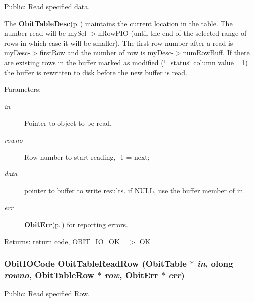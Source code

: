 Public: Read specified data. 

The {\bf Obit\-Table\-Desc}{\rm (p.\,\pageref{structObitTableDesc})} maintains the current location in the table. The number read will be my\-Sel-$>$n\-Row\-PIO (until the end of the selected range of rows in which case it will be smaller). The first row number after a read is my\-Desc-$>$first\-Row and the number of row is my\-Desc-$>$num\-Row\-Buff. If there are existing rows in the buffer marked as modified (\char`\"{}\_\-status\char`\"{} column value =1) the buffer is rewritten to disk before the new buffer is read. \begin{Desc}
\item[Parameters:]
\begin{description}
\item[{\em in}]Pointer to object to be read. \item[{\em rowno}]Row number to start reading, -1 = next; \item[{\em data}]pointer to buffer to write results. if NULL, use the buffer member of in. \item[{\em err}]{\bf Obit\-Err}{\rm (p.\,\pageref{structObitErr})} for reporting errors. \end{description}
\end{Desc}
\begin{Desc}
\item[Returns:]return code, OBIT\_\-IO\_\-OK =$>$ OK \end{Desc}
\subsubsection{\setlength{\rightskip}{0pt plus 5cm}Obit\-IOCode Obit\-Table\-Read\-Row ({\bf Obit\-Table} $\ast$ {\em in}, {\bf olong} {\em rowno}, {\bf Obit\-Table\-Row} $\ast$ {\em row}, {\bf Obit\-Err} $\ast$ {\em err})}\label{ObitTable_8h_a45}


Public: Read specified Row. 

